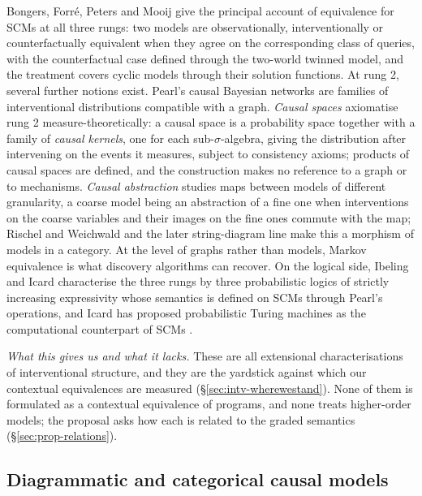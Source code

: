 Bongers, Forré, Peters and Mooij \cite{Bongers_2021} give the principal account of equivalence for SCMs at all three rungs: two models are observationally, interventionally or counterfactually equivalent when they agree on the corresponding class of queries, with the counterfactual case defined through the two-world twinned model, and the treatment covers cyclic models through their solution functions. At rung 2, several further notions exist. Pearl's causal Bayesian networks are families of interventional distributions compatible with a graph. \emph{Causal spaces} \cite{park2024measuretheoreticaxiomatisationcausality,buchholz2024products} axiomatise rung 2 measure-theoretically: a causal space is a probability space together with a family of \emph{causal kernels}, one for each sub-$\sigma$-algebra, giving the distribution after intervening on the events it measures, subject to consistency axioms; products of causal spaces are defined, and the construction makes no reference to a graph or to mechanisms. \emph{Causal abstraction} \cite{rubenstein2017consistency,beckers2019abstracting,rischel2021abstraction,lorenztull2026abstraction,englberger2025causalabstractionscategoricallyunified} studies maps between models of different granularity, a coarse model being an abstraction of a fine one when interventions on the coarse variables and their images on the fine ones commute with the map; Rischel and Weichwald \cite{rischel2021abstraction} and the later string-diagram line make this a morphism of models in a category. At the level of graphs rather than models, Markov equivalence \cite{verma1990equivalence} is what discovery algorithms can recover. On the logical side, Ibeling and Icard \cite{ibeling2020hierarchy} characterise the three rungs by three probabilistic logics of strictly increasing expressivity whose semantics is defined on SCMs through Pearl's operations, and Icard has proposed probabilistic Turing machines as the computational counterpart of SCMs \cite{icard2017programs,ibeling2019openuniverse}.

\emph{What this gives us and what it lacks.} These are all extensional characterisations of interventional structure, and they are the yardstick against which our contextual equivalences are measured (\S\ref{sec:intv-wherewestand}). None of them is formulated as a contextual equivalence of programs, and none treats higher-order models; the proposal asks how each is related to the graded semantics (\S\ref{sec:prop-relations}).

\subsection{Diagrammatic and categorical causal models}\label{sec:diagrammatic}

